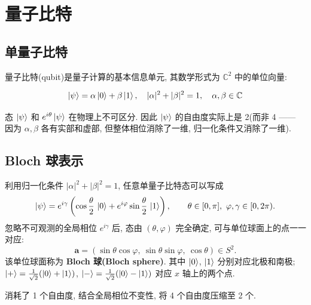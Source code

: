 \documentclass[utf8]{article} %
\numberwithin{equation}{section}   %
\newtheorem{Note}{\hskip 2em {\color{red} 注}}[subsection]
\newtheorem{Eg}{\hskip 2em {\color{black} 例}}[subsection]
\begin{document}
\section{量子比特}
\subsection{单量子比特}
量子比特(qubit)是量子计算的基本信息单元, 其数学形式为 $\mathbb{C}^2$ 中的单位向量: 

\begin{equation}
    \ket{\psi} = \alpha\ket{0} + \beta\ket{1},
    \quad |\alpha|^2 + |\beta|^2 = 1,
    \quad \alpha, \beta \in \mathbb{C}
\end{equation}

\begin{Note}[整体相位]
    态 $\ket{\psi}$ 和 $e^{i\theta}\ket{\psi}$ 在物理上不可区分.
    因此 $\ket{\psi}$ 的自由度实际上是 2(而非 4 —— 因为 $\alpha, \beta$ 各有实部和虚部, 但整体相位消除了一维, 归一化条件又消除了一维).
\end{Note}

\subsection{Bloch 球表示}

\begin{Eg}
利用归一化条件 $|\alpha|^2 + |\beta|^2 = 1$, 任意单量子比特态可以写成
\begin{equation}
    \ket{\psi} = e^{i\gamma}\left(\cos\frac{\theta}{2}\,\ket{0} + e^{i\varphi}\sin\frac{\theta}{2}\,\ket{1}\right),
    \qquad \theta \in [0, \pi],\ \varphi, \gamma \in [0, 2\pi).
\end{equation}
忽略不可观测的全局相位 $e^{i\gamma}$ 后, 态由 $(\theta, \varphi)$ 完全确定, 可与单位球面上的点一一对应:
\begin{equation}
    \mathbf{a} = (\sin\theta\cos\varphi,\ \sin\theta\sin\varphi,\ \cos\theta) \in S^2.
\end{equation}
该单位球面称为 \textbf{Bloch 球(Bloch sphere)}. 其中 $\ket{0}$, $\ket{1}$ 分别对应北极和南极;
$\ket{+} = \frac{1}{\sqrt{2}}(\ket{0}+\ket{1})$, $\ket{-} = \frac{1}{\sqrt{2}}(\ket{0}-\ket{1})$ 对应 $x$ 轴上的两个点.
\end{Eg}

\begin{Note}
    消耗了 1 个自由度, 结合全局相位不变性, 将 4 个自由度压缩至 2 个.
\end{Note}
\end{document}

